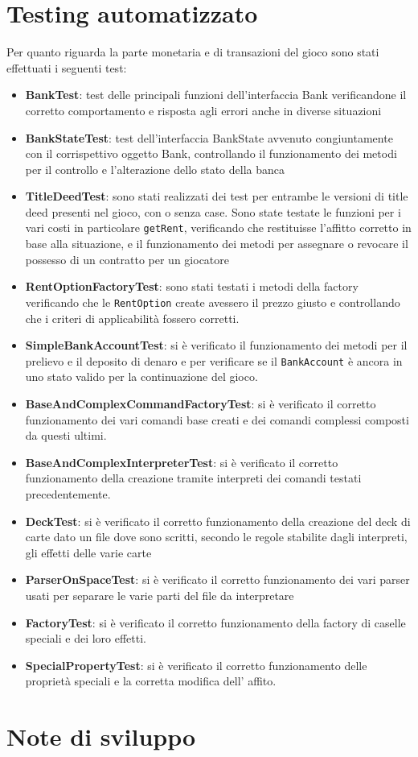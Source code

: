 \section{Testing automatizzato}
Per quanto riguarda la parte monetaria e di transazioni del gioco sono stati effettuati i seguenti test:\newline
\begin{itemize}
    \item \textbf{BankTest}: test delle principali funzioni dell'interfaccia Bank verificandone il corretto comportamento e risposta agli errori anche in diverse situazioni
    \item \textbf{BankStateTest}: test dell'interfaccia BankState avvenuto congiuntamente con il corrispettivo oggetto Bank, controllando il funzionamento dei metodi per il controllo e l'alterazione dello stato della banca 
    \item \textbf{TitleDeedTest}: sono stati realizzati dei test per entrambe le versioni di title deed presenti nel gioco, con o senza case. Sono state testate le funzioni per i vari costi in particolare \texttt{getRent}, verificando che restituisse l'affitto corretto in base alla situazione, e il funzionamento dei metodi per assegnare o revocare il possesso di un contratto per un giocatore
    \item \textbf{RentOptionFactoryTest}: sono stati testati i metodi della factory verificando che le \texttt{RentOption} create avessero il prezzo giusto e controllando che i criteri di applicabilità fossero corretti.
    \item \textbf{SimpleBankAccountTest}: si è verificato il funzionamento dei metodi per il prelievo e il deposito di denaro e per verificare se il \texttt{BankAccount} è ancora in uno stato valido per la continuazione del gioco.  
    \item \textbf{BaseAndComplexCommandFactoryTest}: si è verificato il corretto funzionamento dei vari comandi base creati e dei comandi complessi composti da questi ultimi.
    \item \textbf{BaseAndComplexInterpreterTest}: si è verificato il corretto funzionamento della creazione tramite interpreti dei comandi testati precedentemente.
    \item \textbf{DeckTest}: si è verificato il corretto funzionamento della creazione del deck di carte dato un file dove sono scritti, secondo le regole stabilite dagli interpreti, gli effetti delle varie carte
    \item \textbf{ParserOnSpaceTest}: si è verificato il corretto funzionamento dei vari parser usati per separare le varie parti del file da interpretare
    \item \textbf{FactoryTest}: si è verificato il corretto funzionamento della factory di caselle speciali e dei loro effetti. 
    \item \textbf{SpecialPropertyTest}: si è verificato il corretto funzionamento delle proprietà speciali e la corretta modifica dell' affito.

\end{itemize}
\section{Note di sviluppo}